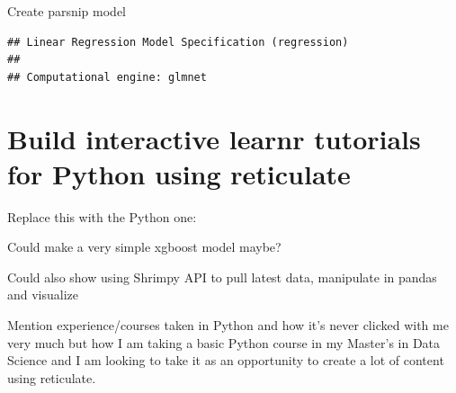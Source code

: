 \documentclass[
]{book}
\newenvironment{Shaded}{\begin{snugshade}}{\end{snugshade}}
\newcommand{\CommentTok}[1]{\textcolor[rgb]{0.56,0.35,0.01}{\textit{#1}}}
\newcommand{\KeywordTok}[1]{\textcolor[rgb]{0.13,0.29,0.53}{\textbf{#1}}}
\newcommand{\NormalTok}[1]{#1}
\newcommand{\OperatorTok}[1]{\textcolor[rgb]{0.81,0.36,0.00}{\textbf{#1}}}
\newcommand{\StringTok}[1]{\textcolor[rgb]{0.31,0.60,0.02}{#1}}
\begin{document}
Create parsnip model

\begin{Shaded}
\end{Shaded}

\begin{verbatim}
## Linear Regression Model Specification (regression)
## 
## Computational engine: glmnet
\end{verbatim}

\begin{Shaded}
\end{Shaded}

\hypertarget{build-interactive-learnr-tutorials-for-python-using-reticulate}{%
\section{Build interactive learnr tutorials for Python using reticulate}\label{build-interactive-learnr-tutorials-for-python-using-reticulate}}

Replace this with the Python one:

Could make a very simple xgboost model maybe?

Could also show using Shrimpy API to pull latest data, manipulate in pandas and visualize

Mention experience/courses taken in Python and how it's never clicked with me very much but how I am taking a basic Python course in my Master's in Data Science and I am looking to take it as an opportunity to create a lot of content using reticulate.
\end{document}

